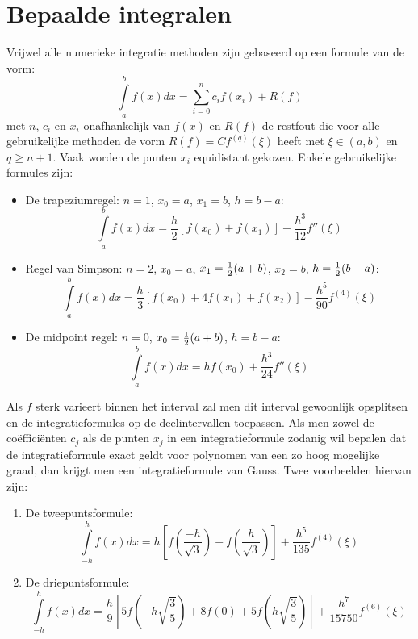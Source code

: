 \documentclass[twoside]{report}
\begin{document}
\section{Bepaalde integralen}
Vrijwel alle numerieke integratie methoden zijn gebaseerd op een formule van
de vorm:
\[
\int\limits_a^bf(x)dx=\sum_{i=0}^nc_if(x_i)+R(f)
\]
met $n$, $c_i$ en $x_i$ onafhankelijk van $f(x)$ en $R(f)$ de restfout die
voor alle gebruikelijke methoden de vorm $R(f)=Cf^{(q)}(\xi)$ heeft met
$\xi\in(a,b)$ en $q\geq n+1$. Vaak worden de punten $x_i$ equidistant gekozen.
Enkele gebruikelijke formules zijn:
\begin{itemize}
\item De trapeziumregel: $n=1$, $x_0=a$, $x_1=b$, $h=b-a$:
\[
\int\limits_a^bf(x)dx=\frac{h}{2}[f(x_0)+f(x_1)]-\frac{h^3}{12}f''(\xi)
\]
\item Regel van Simpson: $n=2$, $x_0=a$, $x_1=\mbox{$\frac{1}{2}$}(a+b)$, $x_2=b$, $h=\mbox{$\frac{1}{2}$}(b-a)$:
\[
\int\limits_a^bf(x)dx=\frac{h}{3}[f(x_0)+4f(x_1)+f(x_2)]-\frac{h^5}{90}f^{(4)}(\xi)
\]
\item De midpoint regel: $n=0$, $x_0=\mbox{$\frac{1}{2}$}(a+b)$, $h=b-a$:
\[
\int\limits_a^bf(x)dx=hf(x_0)+\frac{h^3}{24}f''(\xi)
\]
\end{itemize}
Als $f$ sterk varieert binnen het interval zal men dit interval gewoonlijk
opsplitsen en de integratieformules op de deelintervallen toepassen.
\npar
Als men zowel de co\"effici\"enten $c_j$ als de punten $x_j$ in een
integratieformule zodanig wil bepalen dat de integratieformule exact geldt
voor polynomen van een zo hoog mogelijke graad, dan krijgt men een
integratieformule van Gauss. Twee voorbeelden hiervan zijn:
\begin{enumerate}
\item De tweepuntsformule:
\[
\int\limits_{-h}^hf(x)dx=h\left[f\left(\frac{-h}{\sqrt{3}}\right)+f\left(\frac{h}{\sqrt{3}}\right)\right]+\frac{h^5}{135}f^{(4)}(\xi)
\]
\item De driepuntsformule:
\[
\int\limits_{-h}^hf(x)dx=\frac{h}{9}\left[5f\left(-h\sqrt{\mbox{$\frac{3}{5}$}}\right)+8f(0)+5f\left(h\sqrt{\mbox{$\frac{3}{5}$}}\right)\right]+\frac{h^7}{15750}f^{(6)}(\xi)
\]
\end{enumerate}
\end{document}
